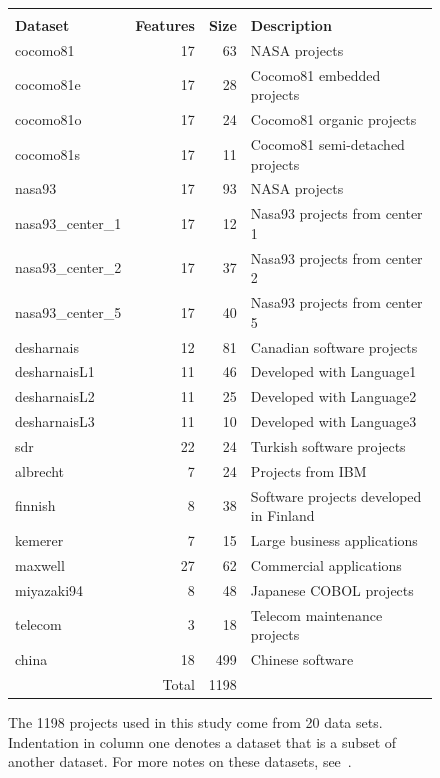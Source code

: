 \documentclass{sig-alternate}
\begin{document}
\begin{figure}[!t]
\begin{center}
{\scriptsize
\begin{tabular}{l|rrl}  
 \textbf{} & \textbf{} & \textbf{} & \textbf{}\\
 \textbf{Dataset} & \textbf{Features} & \textbf{Size} & \textbf{Description}\\\hline
  cocomo81 &17&63& NASA projects\\
  \hspace{4 mm}cocomo81e &17&28& Cocomo81 embedded projects\\ 
  \hspace{4 mm}cocomo81o &17&24& Cocomo81 organic projects\\ 
  \hspace{4 mm}cocomo81s &17&11& Cocomo81 semi-detached projects \\ 
  nasa93 &17&93& NASA projects\\ 
  \hspace{4 mm}nasa93\_center\_1 &17 &12 & Nasa93 projects from center 1\\ 
  \hspace{4 mm}nasa93\_center\_2 &17&37& Nasa93 projects from center 2\\ 
  \hspace{4 mm}nasa93\_center\_5
   &17&40& Nasa93 projects from center 5\\ 
  desharnais &12&81& Canadian software projects\\ 
  \hspace{4 mm}desharnaisL1 &11 &46 & Developed with Language1  \\ 
  \hspace{4 mm}desharnaisL2 &11 &25 & Developed with Language2\\ 
  \hspace{4 mm}desharnaisL3 &11 &10 & Developed with Language3  \\ 
  sdr &22&24& Turkish software projects\\ 
  albrecht &7&24& Projects from IBM\\ 
  finnish &8 &38 &Software projects developed in Finland  \\
  kemerer &7 &15 &Large business applications   \\
  maxwell &27 &62 & Commercial applications  \\
  miyazaki94 &8 &48 &Japanese COBOL projects  \\
  telecom &3 &18 &Telecom maintenance projects    \\
  china &18 &499 &Chinese software \\\cline{2-3}
          &Total  &   1198
\end{tabular}}
\end{center}
\caption{The 1198 projects used in this study come from 20 data sets.
Indentation in column one denotes a dataset that is a subset of another dataset.
 For more notes
on these datasets, 
see~\cite{me11a}.}\label{fig:datasets}
\end{figure}
\end{document}
